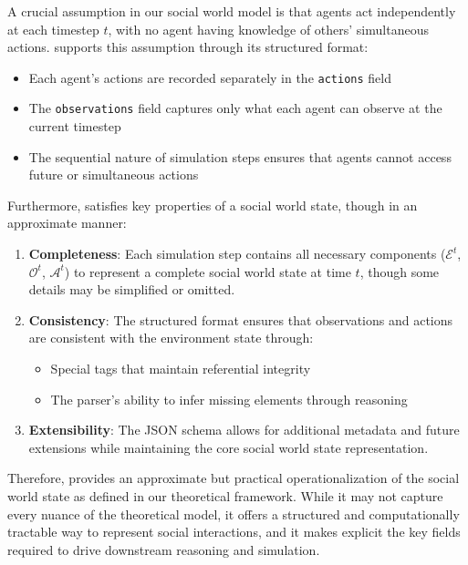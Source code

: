 A crucial assumption in our social world model is that agents act independently at each timestep $t$, with no agent having knowledge of others' simultaneous actions. \protocolname supports this assumption through its structured format:
\begin{itemize}
    \item Each agent's actions are recorded separately in the \texttt{actions} field
    \item The \texttt{observations} field captures only what each agent can observe at the current timestep
    \item The sequential nature of simulation steps ensures that agents cannot access future or simultaneous actions
\end{itemize}

Furthermore, \protocolname satisfies key properties of a social world state, though in an approximate manner:

\begin{enumerate}
    \item \textbf{Completeness}: Each simulation step contains all necessary components ($\mathcal{E}^t$, $\mathcal{O}^t$, $\mathcal{A}^t$) to represent a complete social world state at time $t$, though some details may be simplified or omitted.
    
    \item \textbf{Consistency}: The structured format ensures that observations and actions are consistent with the environment state through:
    \begin{itemize}
        \item Special tags that maintain referential integrity
        \item The parser's ability to infer missing elements through reasoning
    \end{itemize}
    
    \item \textbf{Extensibility}: The JSON schema allows for additional metadata and future extensions while maintaining the core social world state representation.
\end{enumerate}

Therefore, \protocolname provides an approximate but practical operationalization of the social world state as defined in our theoretical framework. While it may not capture every nuance of the theoretical model, it offers a structured and computationally tractable way to represent social interactions, and it makes explicit the key fields required to drive downstream reasoning and simulation.